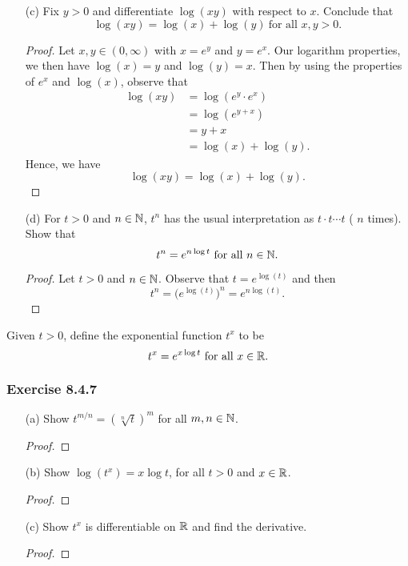 \begin{enumerate}
\begin{proof}
        \end{proof}
    \item[(c)] Fix \( y > 0  \) and differentiate \( \log(xy)  \) with respect to \( x  \). Conclude that 
        \[  \log(xy) = \log(x) + \log(y) \ \text{for all } x,y > 0. \]
        \begin{proof}
        Let \( x, y \in (0,\infty )  \) with \( x = e^{y}   \) and \( y = e^{x} \). Our logarithm properties, we then have \( \log(x) = y  \) and \( \log(y) = x  \). Then by using the properties of \( e^{x}  \) and \( \log(x)   \), observe that  
        \begin{align*}
            \log(xy) &= \log(e^{y} \cdot e^{x} ) \\
                     &= \log(e^{y+x}) \\
                     &= y + x \\
                     &= \log(x) + \log(y).
        \end{align*} 
        Hence, we have 
        \[  \log(xy) = \log(x) + \log(y). \]

        \end{proof}
    \item[(d)] For \( t > 0  \) and \( n \in \mathbb{N}  \), \( t^{n} \) has the usual interpretation as \( t \cdot t \dotsb t  \) ( \( n \) times).
        Show that 
        \[  t^{n} = e^{n \log t } \ \text{for all } n \in \N.   \]
        \begin{proof}
            Let \( t>0  \) and \( n \in \mathbb{N}  \). Observe that \( t = e^{\log(t)} \) and then 
            \[  t^{n} = \Big( e^{\log(t)}  \Big)^{n} = e^{n \log (t)}. \]
        \end{proof}
\end{enumerate}

\begin{definition}{}{}
   Given \( t > 0  \), define the exponential function \( t^{x} \) to be 
   \[  t^{x} = e^{x \log t } \ \text{for all } x \in \mathbb{R}. \]
\end{definition}

\subsubsection{Exercise 8.4.7}  
\begin{enumerate}
    \item[(a)] Show \( t^{m/n} = (\sqrt[n]{t})^{m}  \) for all \( m,n \in \mathbb{N}  \).
        \begin{proof}
        
        \end{proof}
    \item[(b)] Show \( \log(t^{x}) = x \log t \), for all \( t > 0  \) and \( x \in \mathbb{R} \).
        \begin{proof}
        
        \end{proof}
    \item[(c)] Show \( t^{x} \) is differentiable on \( \mathbb{R}  \) and find the derivative.
        \begin{proof}
        
        \end{proof} 
\end{enumerate}

